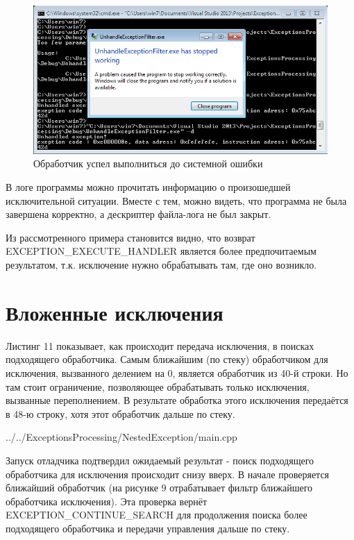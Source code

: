 \documentclass[a4paper, 12pt]{report}		%
\begin{document}
\begin{figure}[h!]
\centering
\includegraphics[scale=0.8]{res/008}
\caption{Обработчик успел выполниться до системной ошибки}
\end{figure}

В логе программы можно прочитать информацию о произошедшей исключительной ситуации. Вместе с тем, можно видеть, что программа не была завершена корректно, а дескриптер файла-лога не был закрыт.



Из рассмотренного примера становится видно, что возврат EXCEPTION\_EXECUTE\_HANDLER является более предпочитаемым результатом, т.к. исключение нужно обрабатывать там, где оно возникло.


\chapter*{Вложенные исключения}

Листинг 11 показывает, как происходит передача исключения, в поисках подходящего обработчика. Самым ближайшим (по стеку) обработчиком для исключения, вызванного делением на 0, является обработчик из 40-й строки. Но там стоит ограничение, позволяющее обрабатывать только исключения, вызванные переполнением. В результате обработка этого исключения передаётся в 48-ю строку, хотя этот обработчик дальше по стеку.


{../../ExceptionsProcessing/NestedException/main.cpp}

Запуск отладчика подтвердил ожидаемый результат - поиск подходящего обработчика для исключения происходит снизу вверх. В начале проверяется ближайший обработчик (на рисунке 9 отрабатывает фильтр ближайшего обработчика исключения). Эта проверка вернёт EXCEPTION\_CONTINUE\_SEARCH для продолжения поиска более подходящего обработчика и передачи управления дальше по стеку.
\end{document}
